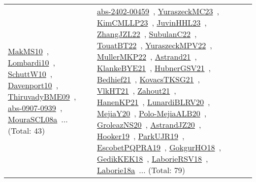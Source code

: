 {\begin{longtable}{lp{3cm}>{\raggedright\arraybackslash}p{6cm}>{\raggedright\arraybackslash}p{6cm}>{\raggedright\arraybackslash}p{8cm}}
\href{works/MakMS10.pdf}{MakMS10}~\cite{MakMS10}, \href{works/Lombardi10.pdf}{Lombardi10}~\cite{Lombardi10}, \href{works/SchuttW10.pdf}{SchuttW10}~\cite{SchuttW10}, \href{works/Davenport10.pdf}{Davenport10}~\cite{Davenport10}, \href{works/ThiruvadyBME09.pdf}{ThiruvadyBME09}~\cite{ThiruvadyBME09}, \href{works/abs-0907-0939.pdf}{abs-0907-0939}~\cite{abs-0907-0939}, \href{works/MouraSCL08a.pdf}{MouraSCL08a}~\cite{MouraSCL08a}... (Total: 43) & \href{works/abs-2402-00459.pdf}{abs-2402-00459}~\cite{abs-2402-00459}, \href{works/YuraszeckMC23.pdf}{YuraszeckMC23}~\cite{YuraszeckMC23}, \href{works/KimCMLLP23.pdf}{KimCMLLP23}~\cite{KimCMLLP23}, \href{works/JuvinHHL23.pdf}{JuvinHHL23}~\cite{JuvinHHL23}, \href{works/ZhangJZL22.pdf}{ZhangJZL22}~\cite{ZhangJZL22}, \href{works/SubulanC22.pdf}{SubulanC22}~\cite{SubulanC22}, \href{works/TouatBT22.pdf}{TouatBT22}~\cite{TouatBT22}, \href{works/YuraszeckMPV22.pdf}{YuraszeckMPV22}~\cite{YuraszeckMPV22}, \href{works/MullerMKP22.pdf}{MullerMKP22}~\cite{MullerMKP22}, \href{works/Astrand21.pdf}{Astrand21}~\cite{Astrand21}, \href{works/KlankeBYE21.pdf}{KlankeBYE21}~\cite{KlankeBYE21}, \href{works/HubnerGSV21.pdf}{HubnerGSV21}~\cite{HubnerGSV21}, \href{works/Bedhief21.pdf}{Bedhief21}~\cite{Bedhief21}, \href{works/KovacsTKSG21.pdf}{KovacsTKSG21}~\cite{KovacsTKSG21}, \href{works/VlkHT21.pdf}{VlkHT21}~\cite{VlkHT21}, \href{works/Zahout21.pdf}{Zahout21}~\cite{Zahout21}, \href{works/HanenKP21.pdf}{HanenKP21}~\cite{HanenKP21}, \href{works/LunardiBLRV20.pdf}{LunardiBLRV20}~\cite{LunardiBLRV20}, \href{works/MejiaY20.pdf}{MejiaY20}~\cite{MejiaY20}, \href{works/Polo-MejiaALB20.pdf}{Polo-MejiaALB20}~\cite{Polo-MejiaALB20}, \href{works/GroleazNS20.pdf}{GroleazNS20}~\cite{GroleazNS20}, \href{works/AstrandJZ20.pdf}{AstrandJZ20}~\cite{AstrandJZ20}, \href{works/Hooker19.pdf}{Hooker19}~\cite{Hooker19}, \href{works/ParkUJR19.pdf}{ParkUJR19}~\cite{ParkUJR19}, \href{works/EscobetPQPRA19.pdf}{EscobetPQPRA19}~\cite{EscobetPQPRA19}, \href{works/GokgurHO18.pdf}{GokgurHO18}~\cite{GokgurHO18}, \href{works/GedikKEK18.pdf}{GedikKEK18}~\cite{GedikKEK18}, \href{works/LaborieRSV18.pdf}{LaborieRSV18}~\cite{LaborieRSV18}, \href{works/Laborie18a.pdf}{Laborie18a}~\cite{Laborie18a}... (Total: 79)\\

\end{longtable}}
